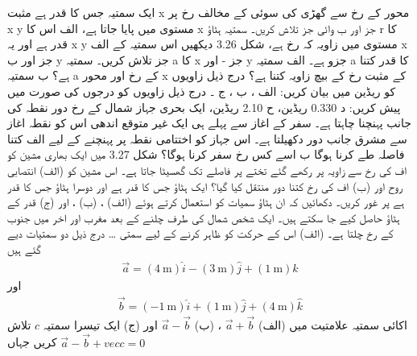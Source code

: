 ایک سمتیہ جس کا قدر
 ہے مثبت x محور کے رخ سے گھڑی کی سوئی کے مخالف رخ
 پر x y مستوی میں پایا جاتا ہے،
 الف اس کا x جز اور
ب  وائی جز تلاش کریں۔ 
سمتیہ ہٹاؤ r کا قدر   ہے اور یہ x y  مستوی میں زاویہ    کہ رخ ہے، شکل 3.26 دیکھیں اس سمتیہ کے الف x جز اور
 ب y جز تلاش کریں۔
 سمتیہ a کا x جز -    اور y جزو    ہے۔  الف سمتیہ a کا قدر کتنا ہے؟  ب سمتیہ a کے رخ اور محور x کے مثبت رخ کے بیچ زاویہ کتنا ہے؟ 
 درج ذیل زاویوں کو ریڈین میں بیان کریں: الف ، ب  ، ج  ۔ درج ذیل زاویوں کو درجوں کی صورت میں پیش کریں: د 0.330 ریڈین،  ح 2.10 ریڈین، 
 ایک بحری جہاز شمال کے رخ  دور نقطہ کی جانب پہنچنا چاہتا ہے۔ سفر کے اغاز سے پہلے ہی ایک غیر متوقع اندھی اس کو نقطہ اغاز سے مشرق جانب     دور دکھیلتا ہے۔ اس جہاز کو اختتامی نقطہ پر پہنچنے کے لیے الف کتنا فاصلہ طے کرنا ہوگا  ب اسے کس رخ سفر کرنا ہوگا؟
شکل 3.27 میں ایک بھاری مشین کو اف کی رخ سے زاویہ   پر رکھے گئے تختے پر   فاصلے تک گھسیٹا جاتا ہے۔ اس مشین کو (الف) انتصابی روح اور  (ب) اف کی رخ کتنا دور منتقل کیا گیا؟ 
ایک ہٹاؤ جس کا قدر    ہے اور دوسرا ہٹاؤ جس کا قدر    ہے پر غور کریں۔ دکھائیں کہ ان ہٹاؤ سمیات کو استعمال کرتے ہوئے  (الف) 
  ، (ب)   ، اور (ج)  قدر کے ہٹاؤ حاصل کیے جا سکتے ہیں۔ 
ایک شخص   شمال کی طرف چلنے کے بعد   مغرب اور اخر میں    جنوب کے رخ چلتا ہے۔ (الف) اس کے حرکت کو ظاہر کرنے کے لیے سمتی …
درج ذیل دو سمتیات دیے گئے ہیں 
\begin{align*}
\vec{a}=(\SI{4}{\meter})\hat{i} - (\SI{3}{\meter})\hat{j} + (\SI{1}{\meter})\hat{k}
\end{align*}
اور
\begin{align*}
\vec{b}=(\SI{-1}{\meter})\hat{i} + (\SI{1}{\meter})\hat{j} + (\SI{4}{\meter})\hat{k}
\end{align*}
اکائی سمتیہ علامتیت میں 
(الف)
\(\vec{a}+\vec{b}\)
، (ب)
 \(\vec{a}-\vec{b}\)
اور (ج)
ایک تیسرا سمتیہ 
\(c\)
تلاش کریں جہاں 
\(\vec{a}-\vec{b}+vec{c}=0\)

